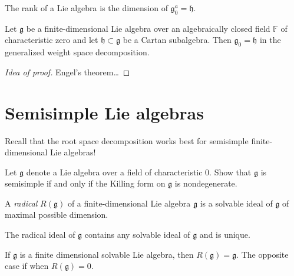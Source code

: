 \begin{remark}
\label{remark-rank-dimen-subal}
The rank of a Lie algebra is the dimension of
$\mathfrak{g}_0^a=\mathfrak{h}$.
\end{remark}

\begin{proposition}
\label{proposition-g0-equal-h-any-carta}
Let $\mathfrak{g}$ be a finite-dimensional
Lie algebra over
an algebraically closed field $\mathbb{F}$ of
characteristic zero
and let $\mathfrak{h}\subset\mathfrak{g}$ be
a Cartan subalgebra.
Then $\mathfrak{g}_0=\mathfrak{h}$ in the
generalized
weight space decomposition.
\end{proposition}

\begin{proof}[Idea of proof]
Engel's theorem…
\end{proof}



\section{Semisimple Lie algebras}
\label{section-semisimple-Lie-algebras}

\noindent
Recall that the root space decomposition
works best for semisimple finite-dimensional
Lie algebras!

\begin{exercise}
\label{exercise-semis-iff-killi-nonde}
\begin{reference}
\cite[Exercise 12.1]{KLAL}
\end{reference}
Let $\mathfrak{g}$ denote a Lie algebra over
a field of characteristic 0.
Show that $\mathfrak{g}$ is semisimple if and
only if
the Killing form on $\mathfrak{g}$ is
nondegenerate.
\end{exercise}

\begin{definition}
\label{definition-radical}
A {\it radical} $R(\mathfrak{g})$ of a
finite-dimensional Lie algebra
$\mathfrak{g}$ is a solvable ideal of
$\mathfrak{g}$ of maximal possible
dimension.
\end{definition}

\begin{proposition}
\label{proposition-radic-ideal-conta-any}
The radical ideal of $\mathfrak{g}$ contains
any solvable ideal of
$\mathfrak{g}$ and is unique.
\end{proposition}

If $\mathfrak{g}$ is a finite dimensional
solvable Lie algebra,
then $R(\mathfrak{g})=\mathfrak{g}$.
The opposite case if when
$R(\mathfrak{g})=0$.


